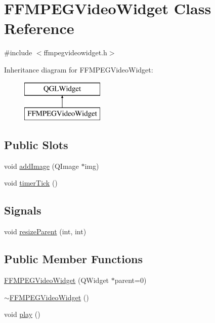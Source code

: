 \hypertarget{classFFMPEGVideoWidget}{\section{F\-F\-M\-P\-E\-G\-Video\-Widget Class Reference}
\label{classFFMPEGVideoWidget}
}


{\ttfamily \#include $<$ffmpegvideowidget.\-h$>$}

Inheritance diagram for F\-F\-M\-P\-E\-G\-Video\-Widget\-:\begin{figure}[H]
\begin{center}
\leavevmode
\includegraphics[height=2.000000cm]{classFFMPEGVideoWidget}
\end{center}
\end{figure}
\subsection*{Public Slots}
\begin{DoxyCompactItemize}
\item 
void \hyperlink{classFFMPEGVideoWidget_aa1c7cfdbf973cc553b4aca82f683df2a}{add\-Image} (Q\-Image $\ast$img)
\item 
void \hyperlink{classFFMPEGVideoWidget_a25da9d4dcf34bfabffd09f968d1bf6fb}{timer\-Tick} ()
\end{DoxyCompactItemize}
\subsection*{Signals}
\begin{DoxyCompactItemize}
\item 
void \hyperlink{classFFMPEGVideoWidget_a05576df29f811639d71cbed8b69ee233}{resize\-Parent} (int, int)
\end{DoxyCompactItemize}
\subsection*{Public Member Functions}
\begin{DoxyCompactItemize}
\item 
\hyperlink{classFFMPEGVideoWidget_af50a9f43743bfd96959a4ed57c7dd9c9}{F\-F\-M\-P\-E\-G\-Video\-Widget} (Q\-Widget $\ast$parent=0)
\item 
\hyperlink{classFFMPEGVideoWidget_a5c083d5fdadead8ecae1e8c024e8bdb4}{$\sim$\-F\-F\-M\-P\-E\-G\-Video\-Widget} ()
\item 
void \hyperlink{classFFMPEGVideoWidget_aa43fafb327e17f47b2a7b8cd55063ef3}{play} ()
\end{DoxyCompactItemize}
